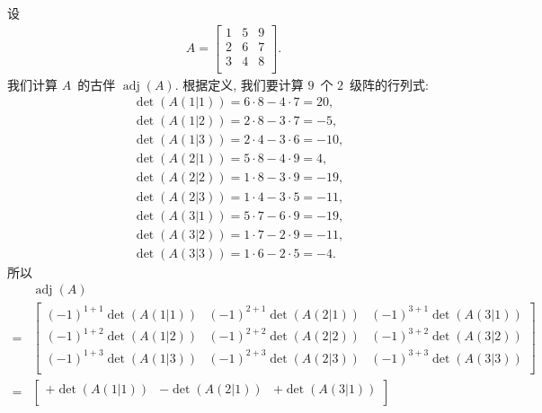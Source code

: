 \documentclass[%
    UTF8,%
    fontset=none,%
    punct=kaiming,%
    zihao=-4,%
    a4paper,%
    oneside,%
]{ctexbook}
\begin{document}
\begin{example}
    设
    \begin{align*}
        A =
        \begin{bmatrix}
            1 & 5 & 9 \\
            2 & 6 & 7 \\
            3 & 4 & 8 \\
        \end{bmatrix}.
    \end{align*}
    我们计算 \(A\)~的古伴 \(\operatorname{adj} {(A)}\).
    根据定义, 我们要计算 \(9\)~个 \(2\)~级阵的行列式:
    \begin{align*}
         & \det {(A(1|1))} = 6 \cdot 8 - 4 \cdot 7 = 20,  \\
         & \det {(A(1|2))} = 2 \cdot 8 - 3 \cdot 7 = -5,  \\
         & \det {(A(1|3))} = 2 \cdot 4 - 3 \cdot 6 = -10, \\
         & \det {(A(2|1))} = 5 \cdot 8 - 4 \cdot 9 = 4,   \\
         & \det {(A(2|2))} = 1 \cdot 8 - 3 \cdot 9 = -19, \\
         & \det {(A(2|3))} = 1 \cdot 4 - 3 \cdot 5 = -11, \\
         & \det {(A(3|1))} = 5 \cdot 7 - 6 \cdot 9 = -19, \\
         & \det {(A(3|2))} = 1 \cdot 7 - 2 \cdot 9 = -11, \\
         & \det {(A(3|3))} = 1 \cdot 6 - 2 \cdot 5 = -4.
    \end{align*}
    所以
    \begin{align*}
             & \operatorname{adj} {(A)}
        \\
        = {} &
        \begin{bmatrix}
            (-1)^{1+1} \det {(A(1|1))}
             & (-1)^{2+1} \det {(A(2|1))}
             & (-1)^{3+1} \det {(A(3|1))} \\
            (-1)^{1+2} \det {(A(1|2))}
             & (-1)^{2+2} \det {(A(2|2))}
             & (-1)^{3+2} \det {(A(3|2))} \\
            (-1)^{1+3} \det {(A(1|3))}
             & (-1)^{2+3} \det {(A(2|3))}
             & (-1)^{3+3} \det {(A(3|3))} \\
        \end{bmatrix}
        \\
        = {} &
        \begin{bmatrix}
            +\det {(A(1|1))}
             & -\det {(A(2|1))}
             & +\det {(A(3|1))} \\

\end{bmatrix}
\end{align*}
\end{example}
\end{document}
